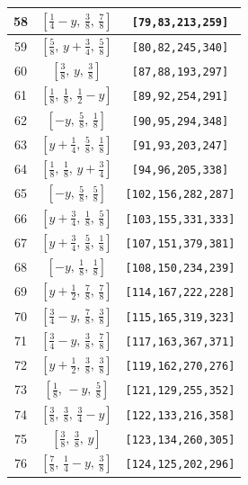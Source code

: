 \documentclass[fleqn,8pt]{jsarticle}
\begin{document}
\begin{longtable}{ccc}
58 & $\left[ \frac{1}{4} - y,\, \frac{3}{8},\, \frac{7}{8} \right]$ & {\tt [79,83,213,259]} \\ \hline
59 & $\left[ \frac{5}{8},\, y + \frac{3}{4},\, \frac{5}{8} \right]$ & {\tt [80,82,245,340]} \\ \hline
60 & $\left[ \frac{3}{8},\, y,\, \frac{3}{8} \right]$ & {\tt [87,88,193,297]} \\ \hline
61 & $\left[ \frac{1}{8},\, \frac{1}{8},\, \frac{1}{2} - y \right]$ & {\tt [89,92,254,291]} \\ \hline
62 & $\left[ - y,\, \frac{5}{8},\, \frac{1}{8} \right]$ & {\tt [90,95,294,348]} \\ \hline
63 & $\left[ y + \frac{1}{4},\, \frac{5}{8},\, \frac{1}{8} \right]$ & {\tt [91,93,203,247]} \\ \hline
64 & $\left[ \frac{1}{8},\, \frac{1}{8},\, y + \frac{3}{4} \right]$ & {\tt [94,96,205,338]} \\ \hline
65 & $\left[ - y,\, \frac{5}{8},\, \frac{5}{8} \right]$ & {\tt [102,156,282,287]} \\ \hline
66 & $\left[ y + \frac{3}{4},\, \frac{1}{8},\, \frac{5}{8} \right]$ & {\tt [103,155,331,333]} \\ \hline
67 & $\left[ y + \frac{3}{4},\, \frac{5}{8},\, \frac{1}{8} \right]$ & {\tt [107,151,379,381]} \\ \hline
68 & $\left[ - y,\, \frac{1}{8},\, \frac{1}{8} \right]$ & {\tt [108,150,234,239]} \\ \hline
69 & $\left[ y + \frac{1}{2},\, \frac{7}{8},\, \frac{7}{8} \right]$ & {\tt [114,167,222,228]} \\ \hline
70 & $\left[ \frac{3}{4} - y,\, \frac{7}{8},\, \frac{3}{8} \right]$ & {\tt [115,165,319,323]} \\ \hline
71 & $\left[ \frac{3}{4} - y,\, \frac{3}{8},\, \frac{7}{8} \right]$ & {\tt [117,163,367,371]} \\ \hline
72 & $\left[ y + \frac{1}{2},\, \frac{3}{8},\, \frac{3}{8} \right]$ & {\tt [119,162,270,276]} \\ \hline
73 & $\left[ \frac{1}{8},\, - y,\, \frac{5}{8} \right]$ & {\tt [121,129,255,352]} \\ \hline
74 & $\left[ \frac{3}{8},\, \frac{3}{8},\, \frac{3}{4} - y \right]$ & {\tt [122,133,216,358]} \\ \hline
75 & $\left[ \frac{3}{8},\, \frac{3}{8},\, y \right]$ & {\tt [123,134,260,305]} \\ \hline
76 & $\left[ \frac{7}{8},\, \frac{1}{4} - y,\, \frac{3}{8} \right]$ & {\tt [124,125,202,296]} \\ \hline

\end{longtable}
\end{document}
